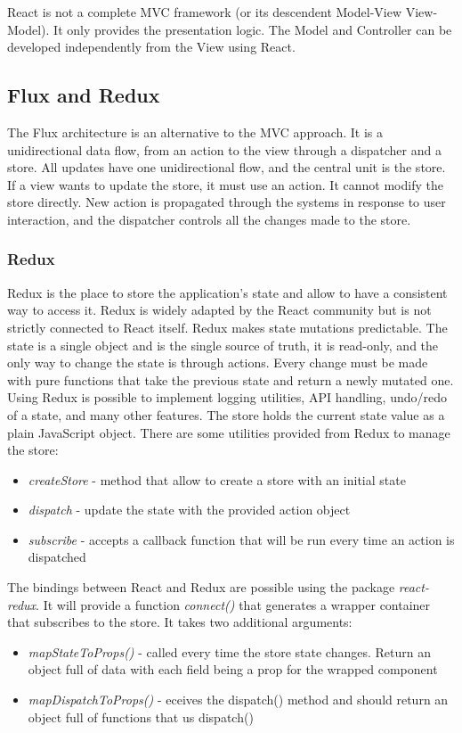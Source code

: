 React is not a complete MVC framework (or its descendent Model-View View-Model). It only provides the presentation logic. The Model and Controller can be developed independently from the View using React.

\subsection*{Flux and Redux}
The Flux architecture is an alternative to the MVC approach. It is a unidirectional data flow, from an action to the view through a dispatcher and a store.
All updates have one unidirectional flow, and the central unit is the store. If a view wants to update the store, it must use an action. It cannot modify the store directly.
New action is propagated through the systems in response to user interaction, and the dispatcher controls all the changes made to the store.

\subsubsection*{Redux}
Redux is the place to store the application's state and allow to have a consistent way to access it. Redux is widely adapted by the React community but is not strictly connected to React itself. Redux makes state mutations predictable.
The state is a single object and is the single source of truth, it is read-only, and the only way to change the state is through actions. Every change must be made with pure functions that take the previous state and return a newly mutated one.
Using Redux is possible to implement logging utilities, API handling, undo/redo of a state, and many other features.  
The store holds the current state value as a plain JavaScript object. There are some utilities provided from Redux to manage the store:
\begin{itemize}
    \item \textit{createStore} - method that allow to create a store with an initial state
    \item \textit{dispatch} - update the state with the provided action object
    \item \textit{subscribe} - accepts a callback function that will be run every time an action is dispatched
\end{itemize}

The bindings between React and Redux are possible using the package \textit{react-redux}. It will provide a function \textit{connect()} that generates a wrapper container that subscribes to the store. It takes two additional arguments:
\begin{itemize}
    \item \textit{mapStateToProps()} - called every time the store state changes. Return an object full of data with each field being a prop for the wrapped component
    \item \textit{mapDispatchToProps()} - eceives the dispatch() method and should return an object full of functions that us dispatch()
\end{itemize}

